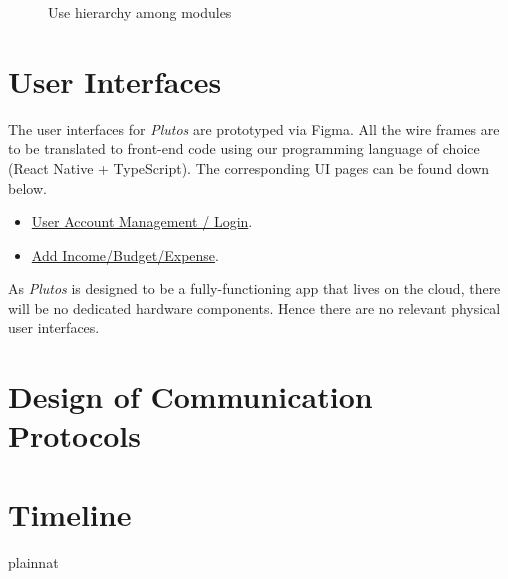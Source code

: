 \documentclass[12pt, titlepage]{article}
\begin{document}

\begin{figure}[H]
\centering
\caption{Use hierarchy among modules}
\label{FigUH}
\end{figure}


\newpage

\section{User Interfaces}

The user interfaces for \textit{Plutos} are prototyped via Figma. All the wire frames are to be translated to front-end code using our programming language of choice (React Native + TypeScript).
The corresponding UI pages can be found down below.
 
\begin{itemize}
	\item \href{https://www.figma.com/design/W2B31TC8L3tgjZm8189vqm/Plutos?node-id=29-45&t=gfR0b4FgWOY40Jt2-1}{User Account Management / Login}.
	\item \href{https://www.figma.com/design/W2B31TC8L3tgjZm8189vqm/Plutos?node-id=112-2933&t=ZbbX5sZyfK6XT3DZ-1}{Add Income/Budget/Expense}.
\end{itemize}

\noindent As \textit{Plutos} is designed to be a fully-functioning app that lives on the cloud, there will be no dedicated hardware components. Hence there are no relevant physical user interfaces.


\section{Design of Communication Protocols}


\section{Timeline}



 {plainnat}


\newpage{}
\end{document}
